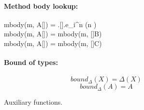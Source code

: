 \begin{figure}[H]
{\begin{minipage}{\linewidth}
			\paragraph{Method body lookup:}
				\begin{mathpar}
						{mbody(m, A[]) = .[].e_i^n (n \in {})} \\

						{mbody(m, A[]) = mbody(m, []B)}\\

						{mbody(m, A[]) = mbody(m, []C)}\\
				\end{mathpar}

			\paragraph{Bound of types:}
					\[bound_\Delta(X) = \Delta(X) \]
					\[bound_\Delta(A) = A \]
    \end{minipage}
  }
	\caption{Auxiliary functions.}
	\label{fig:auxFunctions}
\end{figure}

